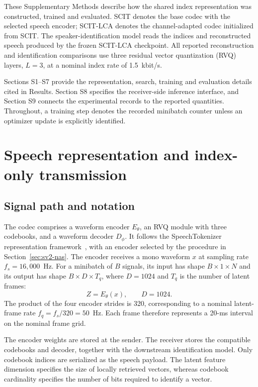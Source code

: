 These Supplementary Methods describe how the shared index representation was constructed, trained and evaluated. SCIT denotes the base codec with the selected speech encoder; SCIT-LCA denotes the channel-adapted codec initialized from SCIT. The speaker-identification model reads the indices and reconstructed speech produced by the frozen SCIT-LCA checkpoint. All reported reconstruction and identification comparisons use three residual vector quantization (RVQ) layers, $L=3$, at a nominal index rate of 1.5~kbit/s.

Sections S1--S7 provide the representation, search, training and evaluation details cited in Results. Section S8 specifies the receiver-side inference interface, and Section S9 connects the experimental records to the reported quantities. Throughout, a training step denotes the recorded minibatch counter unless an optimizer update is explicitly identified.

\section{Speech representation and index-only transmission}
\label{sec:sv2-representation}

\subsection{Signal path and notation}
The codec comprises a waveform encoder $E_\theta$, an RVQ module with three codebooks, and a waveform decoder $D_\phi$. It follows the SpeechTokenizer representation framework~\cite{speechtokenizer}, with an encoder selected by the procedure in Section~\ref{sec:sv2-nas}. The encoder receives a mono waveform $x$ at sampling rate $f_s=16{,}000$~Hz. For a minibatch of $B$ signals, its input has shape $B\times1\times N$ and its output has shape $B\times D\times T_q$, where $D=1024$ and $T_q$ is the number of latent frames:
\begin{equation}
 Z=E_\theta(x),\qquad D=1024.
 \label{eq:sv2-encoder}
\end{equation}
The product of the four encoder strides is 320, corresponding to a nominal latent-frame rate $f_q=f_s/320=50$~Hz. Each frame therefore represents a 20-ms interval on the nominal frame grid.

The encoder weights are stored at the sender. The receiver stores the compatible codebooks and decoder, together with the downstream identification model. Only codebook indices are serialized as the speech payload. The latent feature dimension specifies the size of locally retrieved vectors, whereas codebook cardinality specifies the number of bits required to identify a vector.

